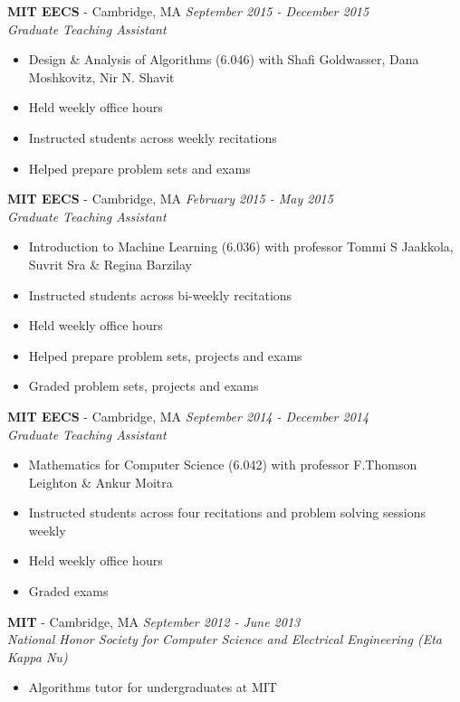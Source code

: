 \documentclass{article}
\newenvironment{changemargin}[2]{%
  \begin{list}{}{%
    \setlength{\topsep}{0pt}%
    \setlength{\leftmargin}{#1}%
    \setlength{\rightmargin}{#2}%
    \setlength{\listparindent}{\parindent}%
    \setlength{\itemindent}{\parindent}%
    \setlength{\parsep}{\parskip}%
  }%
  \item[]}{\end{list}
}
\newenvironment{body} {
	\vspace*{-16pt}
	\begin{changemargin}{-0.25in}{-0.5in}
  }	
	{\end{changemargin}
}
\begin{document}
\begin{body}
   	\textbf{MIT EECS} - Cambridge, MA \hfill \emph{September 2015 - December 2015}\\
	\emph{Graduate Teaching Assistant}\\
	\vspace*{-3pt}
	\begin{itemize} \itemsep -2pt
        \item Design \& Analysis of Algorithms (6.046) with Shafi Goldwasser, Dana Moshkovitz, Nir N. Shavit
        \item Held weekly office hours
        \item Instructed students across weekly recitations
        \item Helped prepare problem sets and exams
	\end{itemize}
   
    \textbf{MIT EECS} - Cambridge, MA \hfill \emph{February 2015 - May 2015}\\
	\emph{Graduate Teaching Assistant}\\
	\vspace*{-3pt}
	\begin{itemize} \itemsep -2pt
        \item Introduction to Machine Learning (6.036) with professor Tommi S Jaakkola, Suvrit Sra \& Regina Barzilay
        \item Instructed students across bi-weekly recitations
        \item Held weekly office hours
        \item Helped prepare problem sets, projects and exams
        \item Graded problem sets, projects and exams
	\end{itemize}
    
    \textbf{MIT EECS} - Cambridge, MA \hfill \emph{September 2014 - December 2014}\\
	\emph{Graduate Teaching Assistant}\\
	\vspace*{-3pt}
	\begin{itemize} \itemsep -2pt
		\item Mathematics for Computer Science (6.042) with professor F.Thomson Leighton \& Ankur Moitra
        \item Instructed students across four recitations and problem solving sessions weekly
        \item Held weekly office hours
        \item Graded exams
	\end{itemize}
    
    \textbf{MIT} - Cambridge, MA \hfill \emph{September 2012 - June 2013}\\
	\emph{National Honor Society for Computer Science and Electrical Engineering (Eta Kappa Nu)}\\
	\vspace*{-3pt}
	\begin{itemize} \itemsep -2pt
		\item Algorithms tutor for undergraduates at MIT 
	\end{itemize}

\end{body}
\end{document}
